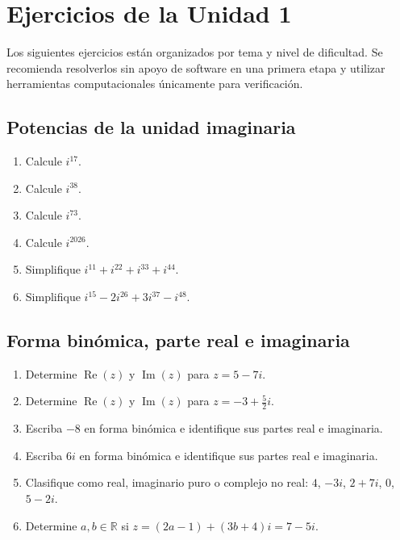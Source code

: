 \section{Ejercicios de la Unidad 1}

Los siguientes ejercicios están organizados por tema y nivel de dificultad. Se recomienda resolverlos sin apoyo de software en una primera etapa y utilizar herramientas computacionales únicamente para verificación.

\subsection{Potencias de la unidad imaginaria}
\begin{enumerate}
\item Calcule $i^{17}$.
\item Calcule $i^{38}$.
\item Calcule $i^{73}$.
\item Calcule $i^{2026}$.
\item Simplifique $i^{11}+i^{22}+i^{33}+i^{44}$.
\item Simplifique $i^{15}-2i^{26}+3i^{37}-i^{48}$.
\end{enumerate}

\subsection{Forma binómica, parte real e imaginaria}
\begin{enumerate}
\item Determine $\operatorname{Re}(z)$ y $\operatorname{Im}(z)$ para $z=5-7i$.
\item Determine $\operatorname{Re}(z)$ y $\operatorname{Im}(z)$ para $z=-3+\frac{5}{2}i$.
\item Escriba $-8$ en forma binómica e identifique sus partes real e imaginaria.
\item Escriba $6i$ en forma binómica e identifique sus partes real e imaginaria.
\item Clasifique como real, imaginario puro o complejo no real: $4$, $-3i$, $2+7i$, $0$, $5-2i$.
\item Determine $a,b\in\mathbb{R}$ si $z=(2a-1)+(3b+4)i=7-5i$.
\end{enumerate}

